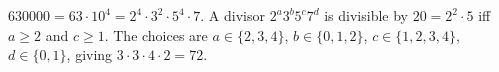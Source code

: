 $630000=63\cdot10^4=2^4\cdot3^2\cdot5^4\cdot7$. A divisor $2^a3^b5^c7^d$ is divisible by $20=2^2\cdot5$ iff $a\ge2$ and $c\ge1$. The choices are $a\in\{2,3,4\}$, $b\in\{0,1,2\}$, $c\in\{1,2,3,4\}$, $d\in\{0,1\}$, giving $3\cdot3\cdot4\cdot2=\boxed{72}$.
